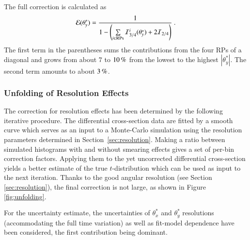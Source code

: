 The full correction is calculated as
\begin{equation}
\label{efficiency}
	{\cal E}(\theta_y^*) = {1\over 1 - \left( \sum\limits_{i\in \rm RPs} {\cal I}^i_{3/4}(\theta_y^*) + 2 {\cal I}_{2/4} \right) } \ .
\end{equation}
The first term in the parentheses sums the contributions from the four RPs of a diagonal and grows from about $7$ to $10\,{\rm \%}$ from the lowest to the highest $|\theta_y^*|$. The second term amounts to about $3\,{\rm \%}$.





\subsubsection{Unfolding of Resolution Effects}
\label{sec:unfolding}

The correction for resolution effects has been determined by the following iterative procedure. The differential cross-section data are fitted by a smooth curve which serves as an input to a Monte-Carlo simulation using the resolution parameters determined in Section~\ref{sec:resolution}. Making a ratio between simulated histograms with and without smearing effects gives a set of per-bin correction factors. Applying them to the yet uncorrected differential cross-section yields a better estimate of the true $t$-distribution which can be used as input to the next iteration. Thanks to the good angular resolution (see Section \ref{sec:resolution}), the final correction is not large, as shown in Figure \ref{fig:unfolding}.

For the uncertainty estimate, the uncertainties of $\theta_x^*$ and $\theta_y^*$ resolutions (accommodating the full time variation) as well as fit-model dependence have been considered, the first contribution being dominant.


